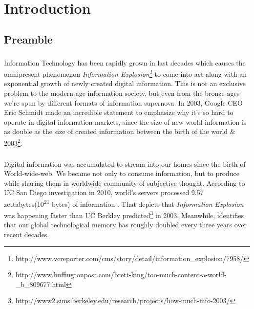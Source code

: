 \documentclass[a4paper,12pt,oneside]{book}
\theoremstyle{definition}
\theoremstyle{remark}
\begin{document}
\chapter{Introduction}
\setcounter{page}{1}
\section{Preamble}
\paragraph*{}
Information Technology has been rapidly grown in last decades which causes the omnipresent phenomenon \emph{Information Explosion\footnote{http://www.vcreporter.com/cms/story/detail/information\_explosion/7958/}} to come into act along with an exponential growth of newly created digital information. This is not an exclusive problem to the modern age information society, but even from the bronze ages we're spun by different formats of information supernova. In 2003, Google CEO Eric Schmidt made an incredible statement to emphasize why it's so hard to operate in digital information markets, since the size of new world information is as double as the size of created information between the birth of the world \& 2003\footnote{http://www.huffingtonpost.com/brett-king/too-much-content-a-world-\_b\_809677.html}.
\paragraph*{}
Digital information was accumulated to stream into our homes since the birth of World-wide-web. We became not only to consume information, but to produce while sharing them in worldwide community of subjective thought. According to UC San Diego investigation in 2010, world's servers processed 9.57 zettabytes(10\textsuperscript{21} bytes) of information \cite{JamesE.ShortRogerE.Bohn2011}. That depicts that \emph{Information Explosion} was happening faster than UC Berkley predicted\footnote{http://www2.sims.berkeley.edu/research/projects/how-much-info-2003/} in 2003. Meanwhile, \cite{Hilbert2012} identifies that our global technological memory has roughly doubled every three years over recent decades. 
\end{document}
